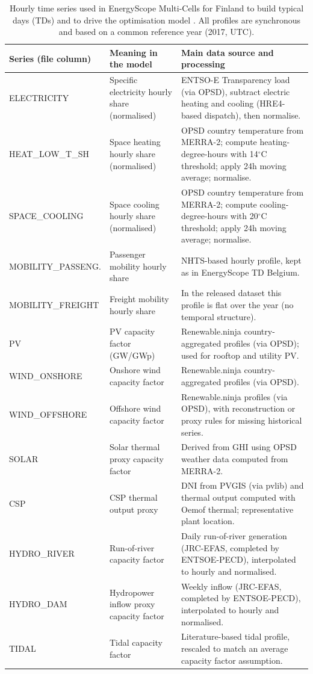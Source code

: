 \documentclass{article}
\begin{document}
\begin{table}[t]
\centering
\footnotesize
\caption{Hourly time series used in EnergyScope Multi-Cells for Finland to build typical days (TDs) and to drive the optimisation model \citep{thiranExploringOptionsFossilfree2025}. All profiles are synchronous and based on a common reference year (2017, UTC).}
\label{tab:fi_td_inputs_sources}
\begin{tabular}{p{3.1cm}p{5.6cm}p{5.4cm}}
\toprule
\textbf{Series (file column)} & \textbf{Meaning in the model} & \textbf{Main data source and processing} \\
\midrule
ELECTRICITY & Specific electricity hourly share (normalised) & ENTSO-E Transparency load (via OPSD), subtract electric heating and cooling (HRE4-based dispatch), then normalise. \\
HEAT\_LOW\_T\_SH & Space heating hourly share (normalised) & OPSD country temperature from MERRA-2; compute heating-degree-hours with 14$^\circ$C threshold; apply 24h moving average; normalise. \\
SPACE\_COOLING & Space cooling hourly share (normalised) & OPSD country temperature from MERRA-2; compute cooling-degree-hours with 20$^\circ$C threshold; apply 24h moving average; normalise. \\
MOBILITY\_PASSENG. & Passenger mobility hourly share & NHTS-based hourly profile, kept as in EnergyScope TD Belgium. \\
MOBILITY\_FREIGHT & Freight mobility hourly share & In the released dataset this profile is flat over the year (no temporal structure). \\
\midrule
PV & PV capacity factor (GW/GWp) & Renewable.ninja country-aggregated profiles (via OPSD); used for rooftop and utility PV. \\
WIND\_ONSHORE & Onshore wind capacity factor & Renewable.ninja country-aggregated profiles (via OPSD). \\
WIND\_OFFSHORE & Offshore wind capacity factor & Renewable.ninja profiles (via OPSD), with reconstruction or proxy rules for missing historical series. \\
SOLAR & Solar thermal proxy capacity factor & Derived from GHI using OPSD weather data computed from MERRA-2. \\
CSP & CSP thermal output proxy & DNI from PVGIS (via pvlib) and thermal output computed with Oemof thermal; representative plant location. \\
HYDRO\_RIVER & Run-of-river capacity factor & Daily run-of-river generation (JRC-EFAS, completed by ENTSOE-PECD), interpolated to hourly and normalised. \\
HYDRO\_DAM & Hydropower inflow proxy capacity factor & Weekly inflow (JRC-EFAS, completed by ENTSOE-PECD), interpolated to hourly and normalised. \\
TIDAL & Tidal capacity factor & Literature-based tidal profile, rescaled to match an average capacity factor assumption. \\
\bottomrule
\end{tabular}
\end{table}
\end{document}
